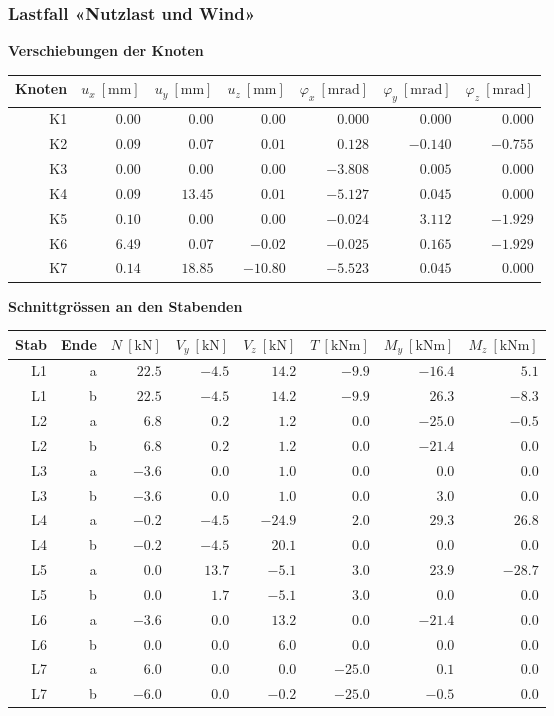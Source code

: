 \documentclass[11pt,a4paper]{article}
\begin{document}
\subsubsection{Lastfall «Nutzlast und Wind»}
\noindent\textbf{Verschiebungen der Knoten}
\begin{longtable}{rrrrrrr}
\hline
Knoten & $u_x\ [\mathrm{mm}]$ & $u_y\ [\mathrm{mm}]$ & $u_z\ [\mathrm{mm}]$ & $\varphi_x\ [\mathrm{mrad}]$ & $\varphi_y\ [\mathrm{mrad}]$ & $\varphi_z\ [\mathrm{mrad}]$ \\
\hline
\endhead
K1 & $0.00$ & $0.00$ & $0.00$ & $0.000$ & $0.000$ & $0.000$ \\
K2 & $0.09$ & $0.07$ & $0.01$ & $0.128$ & $-0.140$ & $-0.755$ \\
K3 & $0.00$ & $0.00$ & $0.00$ & $-3.808$ & $0.005$ & $0.000$ \\
K4 & $0.09$ & $13.45$ & $0.01$ & $-5.127$ & $0.045$ & $0.000$ \\
K5 & $0.10$ & $0.00$ & $0.00$ & $-0.024$ & $3.112$ & $-1.929$ \\
K6 & $6.49$ & $0.07$ & $-0.02$ & $-0.025$ & $0.165$ & $-1.929$ \\
K7 & $0.14$ & $18.85$ & $-10.80$ & $-5.523$ & $0.045$ & $0.000$ \\
\hline
\end{longtable}
\noindent\textbf{Schnittgrössen an den Stabenden}
\begin{longtable}{rrrrrrrr}
\hline
Stab & Ende & $N\ [\mathrm{kN}]$ & $V_y\ [\mathrm{kN}]$ & $V_z\ [\mathrm{kN}]$ & $T\ [\mathrm{kNm}]$ & $M_y\ [\mathrm{kNm}]$ & $M_z\ [\mathrm{kNm}]$ \\
\hline
\endhead
L1 & a & $22.5$ & $-4.5$ & $14.2$ & $-9.9$ & $-16.4$ & $5.1$ \\
L1 & b & $22.5$ & $-4.5$ & $14.2$ & $-9.9$ & $26.3$ & $-8.3$ \\
L2 & a & $6.8$ & $0.2$ & $1.2$ & $0.0$ & $-25.0$ & $-0.5$ \\
L2 & b & $6.8$ & $0.2$ & $1.2$ & $0.0$ & $-21.4$ & $0.0$ \\
L3 & a & $-3.6$ & $0.0$ & $1.0$ & $0.0$ & $0.0$ & $0.0$ \\
L3 & b & $-3.6$ & $0.0$ & $1.0$ & $0.0$ & $3.0$ & $0.0$ \\
L4 & a & $-0.2$ & $-4.5$ & $-24.9$ & $2.0$ & $29.3$ & $26.8$ \\
L4 & b & $-0.2$ & $-4.5$ & $20.1$ & $0.0$ & $0.0$ & $0.0$ \\
L5 & a & $0.0$ & $13.7$ & $-5.1$ & $3.0$ & $23.9$ & $-28.7$ \\
L5 & b & $0.0$ & $1.7$ & $-5.1$ & $3.0$ & $0.0$ & $0.0$ \\
L6 & a & $-3.6$ & $0.0$ & $13.2$ & $0.0$ & $-21.4$ & $0.0$ \\
L6 & b & $0.0$ & $0.0$ & $6.0$ & $0.0$ & $0.0$ & $0.0$ \\
L7 & a & $6.0$ & $0.0$ & $0.0$ & $-25.0$ & $0.1$ & $0.0$ \\
L7 & b & $-6.0$ & $0.0$ & $-0.2$ & $-25.0$ & $-0.5$ & $0.0$ \\
\hline
\end{longtable}
\end{document}
